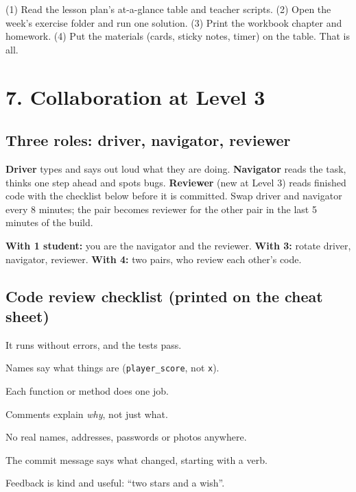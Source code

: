 \documentclass[level=3,teacher]{kidscode}
\begin{document}
\begin{tip}
(1) Read the lesson plan's at-a-glance table and teacher scripts. (2) Open the week's exercise
folder and run one solution. (3) Print the workbook chapter and homework. (4) Put the materials
(cards, sticky notes, timer) on the table. That is all.
\end{tip}

\section{7. Collaboration at Level 3}

\subsection{Three roles: driver, navigator, reviewer}
\begin{pairroles}
\textbf{Driver} types and says out loud what they are doing. \textbf{Navigator} reads the task,
thinks one step ahead and spots bugs. \textbf{Reviewer} (new at Level 3) reads finished code with
the checklist below before it is committed. Swap driver and navigator every 8 minutes; the pair
becomes reviewer for the other pair in the last 5 minutes of the build.

\textbf{With 1 student:} you are the navigator and the reviewer. \textbf{With 3:} rotate driver,
navigator, reviewer. \textbf{With 4:} two pairs, who review each other's code.
\end{pairroles}

\subsection{Code review checklist (printed on the cheat sheet)}
\begin{checklist}
  \item It runs without errors, and the tests pass.
  \item Names say what things are (\texttt{player\_score}, not \texttt{x}).
  \item Each function or method does one job.
  \item Comments explain \emph{why}, not just what.
  \item No real names, addresses, passwords or photos anywhere.
  \item The commit message says what changed, starting with a verb.
  \item Feedback is kind and useful: \enquote{two stars and a wish}.
\end{checklist}
\end{document}
